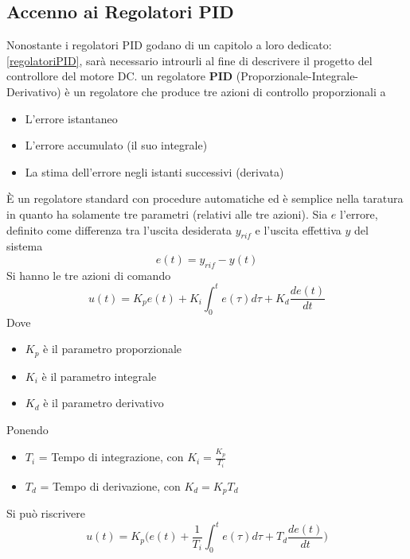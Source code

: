 \documentclass[10pt, letterpaper]{report}
\begin{document}
\subsection{Accenno ai Regolatori PID}
Nonostante i regolatori PID godano di un capitolo a loro dedicato: \ref{regolatoriPID}, sarà necessario introurli al fine di descrivere il progetto del controllore del motore DC.\acc 
{} un regolatore \textbf{PID} (Proporzionale-Integrale-Derivativo) è un regolatore che produce tre azioni di controllo proporzionali a \begin{itemize}
    \item L'errore istantaneo 
    \item L'errore accumulato (il suo integrale)
    \item La stima dell'errore negli istanti successivi (derivata)
\end{itemize}
È un regolatore standard con procedure automatiche ed è semplice nella taratura in quanto ha solamente tre parametri (relativi alle tre azioni). \acc 
Sia $e$ l'errore, definito come differenza tra l'uscita desiderata $y_{rif}$ e l'uscita effettiva $y$ del sistema 
$$ e(t)=y_{rif}-y(t)$$
Si hanno le tre azioni di comando 
$$ u(t)=K_pe(t)+K_i\int_0^t e(\tau)d\tau+K_d\frac{de(t)}{dt}$$
Dove \begin{itemize}
    \item $K_p$ è il parametro proporzionale 
    \item $K_i$ è il parametro integrale 
    \item $K_d$ è il parametro derivativo 
\end{itemize}
Ponendo \begin{itemize}
\item $T_i$ = Tempo di integrazione, con $K_i=\frac{K_p}{T_i}$
\item $T_d$ = Tempo di derivazione, con $K_d=K_pT_d$
\end{itemize}
Si può riscrivere
$$ u(t)=K_p\Big(e(t)+\frac{1}{T_i}\int_0^t e(\tau)d\tau+T_d\frac{de(t)}{dt}\Big)$$
\end{document}
